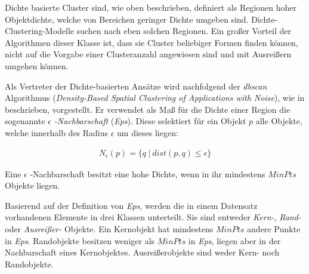 Dichte basierte Cluster sind, wie oben beschrieben, definiert als Regionen hoher Objektdichte, welche
von Bereichen geringer Dichte umgeben sind. Dichte-Clustering-Modelle suchen nach eben solchen Regionen.
Ein großer Vorteil der Algorithmen dieser Klasse ist, dass sie Cluster beliebiger Formen finden können,
nicht auf die Vorgabe einer Clusteranzahl angewiesen sind und mit Ausreißern umgehen können.

Als Vertreter der Dichte-basierten Ansätze wird nachfolgend der \textit{\acrshort*{dbscan}} Algorithmus
(\textit{Density-Based Spatial Clustering of Applications with Noise}), wie in \cite[]{Gao2012} beschrieben, vorgestellt.
Er verwendet als Maß für die Dichte einer Region die sogenannte \textit{$\epsilon$ -Nachbarschaft} (\textit{Eps}).
Diese selektiert für ein Objekt $p$ alle Objekte, welche innerhalb des Radius $\epsilon$ um dieses liegen:

\begin{ceqn}
\begin{align}
    \label{eq_dbscan_1}
    N_{\epsilon}(p) = \{ q\ |\ dist(p,q) \leq \epsilon \}
\end{align}
\end{ceqn}

Eine $\epsilon$ -Nachbarschaft besitzt eine hohe Dichte, wenn in ihr mindestens $MinPts$ Objekte liegen.

Basierend auf der Definition von \textit{Eps}, werden die in einem Datensatz vorhandenen Elemente in
drei Klassen unterteilt. Sie sind entweder \textit{Kern-}, \textit{Rand-} oder \textit{Ausreißer-} Objekte.
Ein Kernobjekt hat mindestens $MinPts$ andere Punkte in \textit{Eps}.
Randobjekte besitzen weniger als $MinPts$ in \textit{Eps}, liegen aber in der Nachbarschaft eines Kernobjektes.
Ausreißerobjekte sind weder Kern- noch Randobjekte.

